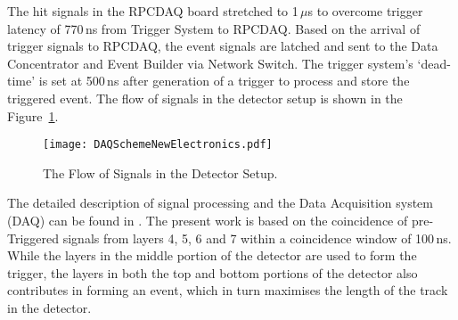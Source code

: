 The hit signals in the RPCDAQ board
stretched to 1\,$\mu$s to overcome trigger latency of 770\,ns from
Trigger System to RPCDAQ. Based on the arrival of trigger signals to
RPCDAQ, the event signals are latched and sent to the Data Concentrator
and Event Builder via Network Switch. The trigger system's `dead-time'
is set at 500\,ns after generation of a trigger to process and store %
the triggered event.
The flow of signals in the detector setup is shown in the
Figure~\ref{fig:sigflow}.
\begin{figure}[h]
  \texttt{[image: DAQSchemeNewElectronics.pdf]} 
  \caption{The Flow of Signals in the Detector Setup.}
  \label{fig:sigflow}
\end{figure}
The detailed description of signal processing and the Data Acquisition
system (DAQ) can be found in \cite{elec1}. The present work is based
on the coincidence of pre-Triggered signals from layers 4, 5, 6 and 7
within a coincidence window of 100\,ns. While the layers in the middle
portion of the detector are used to form the trigger, the layers in
both the top and bottom portions of the detector also contributes in
forming an event, which in turn maximises the length of the track in
the detector.

